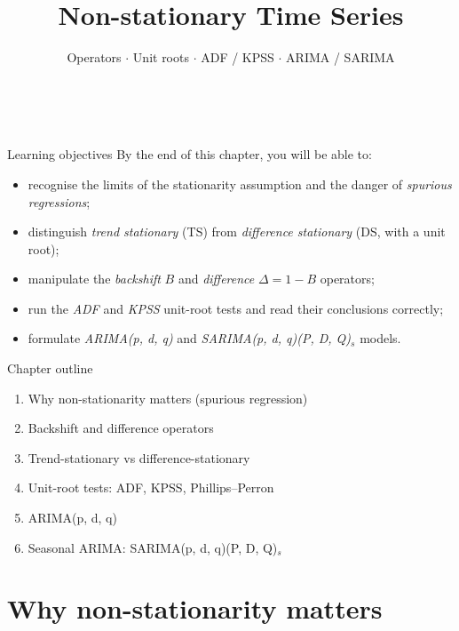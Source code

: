 \documentclass[aspectratio=169]{beamer}
\title[\moduleNom\ -- Ch.4]{Non-stationary Time Series}
\subtitle{Operators $\cdot$ Unit roots $\cdot$ ADF / KPSS $\cdot$ ARIMA / SARIMA}
\author{\auteurNom \\ \footnotesize\auteurEmail}
\institute{\auteurInstitution}
\date{\anneeUniversitaire}
\begin{document}
\begin{frame}\titlepage\end{frame}

\begin{frame}{Learning objectives}
  By the end of this chapter, you will be able to:
  \begin{itemize}
    \item recognise the limits of the stationarity assumption and
          the danger of \emph{spurious regressions};
    \item distinguish \emph{trend stationary} (TS) from
          \emph{difference stationary} (DS, with a unit root);
    \item manipulate the \emph{backshift} $B$ and \emph{difference}
          $\Delta = 1 - B$ operators;
    \item run the \emph{ADF} and \emph{KPSS} unit-root tests and read
          their conclusions correctly;
    \item formulate \emph{ARIMA(p, d, q)} and
          \emph{SARIMA(p, d, q)(P, D, Q)$_s$} models.
  \end{itemize}
\end{frame}

\begin{frame}{Chapter outline}
  \begin{enumerate}
    \item Why non-stationarity matters (spurious regression)
    \item Backshift and difference operators
    \item Trend-stationary vs difference-stationary
    \item Unit-root tests: ADF, KPSS, Phillips--Perron
    \item ARIMA(p, d, q)
    \item Seasonal ARIMA: SARIMA(p, d, q)(P, D, Q)$_s$
  \end{enumerate}
\end{frame}

\section{Why non-stationarity matters}
\end{document}
